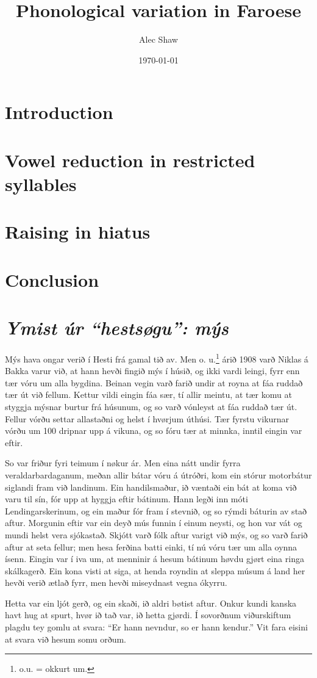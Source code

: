 \documentclass[a4paper]{article}
\title{Phonological variation in Faroese}
\author{Alec Shaw}
\date{\today}
\begin{document}
\maketitle

\section{Introduction}

\section{Vowel reduction in restricted syllables}

\section{Raising in hiatus}

\section{Conclusion}

\appendix
\section{\textit{Ymist úr ``hestsøgu'': mýs} \parencite[177]{lockwood:02}}\label{app:readingtext}

Mýs hava ongar verið í Hesti frá gamal tið av. Men o. u.\footnote{o.u. = okkurt um.} árið 1908 varð Niklas á Bakka varur við, at hann hevði fingið mýs í húsið, og ikki vardi leingi, fyrr enn tær vóru um alla bygdina. Beinan vegin varð farið undir at royna at fáa ruddað tær út við fellum. Kettur vildi eingin fáa sær, tí allir meintu, at tær komu at styggja mýsnar burtur frá húsunum, og so varð vónleyst at fáa ruddað tær út. Fellur vórðu settar allastaðni og helst í hvørjum úthúsi. Tær fyrstu vikurnar vórðu um 100 dripnar upp á vikuna, og so fóru tær at minnka, inntil eingin var eftir.

So var friður fyri teimum í nøkur ár. Men eina nátt undir fyrra veraldarbardaganum, meðan allir bátar vóru á útróðri, kom ein stórur motorbátur siglandi fram við landinum. Ein handilsmaður, ið væntaði ein bát at koma við varu til sín, fór upp at hyggja eftir bátinum. Hann legði inn móti Lendingarskerinum, og ein maður fór fram í stevnið, og so rýmdi báturin av stað aftur. Morgunin eftir var ein deyð mús funnin í einum neysti, og hon var vát og mundi helst vera sjókastað. Skjótt varð fólk aftur varigt við mýs, og so varð farið aftur at seta fellur; men hesa ferðina batti einki, tí nú vóru tær um alla oynna ísenn. Eingin var í iva um, at menninir á hesum bátinum høvdu gjørt eina ringa skálkagerð. Ein kona visti at siga, at henda royndin at sleppa músum á land her hevði verið ætlað fyrr, men hevði miseydnast vegna ókyrru.

Hetta var ein ljót gerð, og ein skaði, ið aldri bøtist aftur. Onkur kundi kanska havt hug at spurt, hvør ið tað var, ið hetta gjørdi. Í sovorðnum viðurskiftum plagdu tey gomlu at svara: ``Er hann nevndur, so er hann kendur.'' Vit fara eisini at svara við hesum somu orðum.

\nocite{*}

\printbibliography
\end{document}
